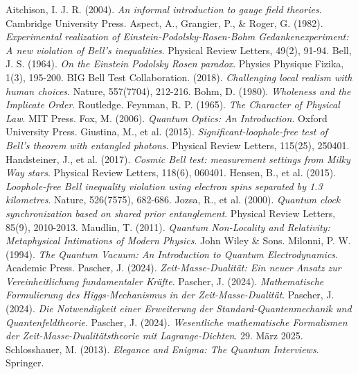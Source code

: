 \documentclass[12pt,a4paper]{article}
\begin{document}
	
	\begin{thebibliography}{99}
		 Aitchison, I. J. R. (2004). \textit{An informal introduction to gauge field theories}. Cambridge University Press.
		 Aspect, A., Grangier, P., \& Roger, G. (1982). \textit{Experimental realization of Einstein-Podolsky-Rosen-Bohm Gedankenexperiment: A new violation of Bell's inequalities}. Physical Review Letters, 49(2), 91-94.
		 Bell, J. S. (1964). \textit{On the Einstein Podolsky Rosen paradox}. Physics Physique Fizika, 1(3), 195-200.
		 BIG Bell Test Collaboration. (2018). \textit{Challenging local realism with human choices}. Nature, 557(7704), 212-216.
		 Bohm, D. (1980). \textit{Wholeness and the Implicate Order}. Routledge.
		 Feynman, R. P. (1965). \textit{The Character of Physical Law}. MIT Press.
		 Fox, M. (2006). \textit{Quantum Optics: An Introduction}. Oxford University Press.
		 Giustina, M., et al. (2015). \textit{Significant-loophole-free test of Bell's theorem with entangled photons}. Physical Review Letters, 115(25), 250401.
		 Handsteiner, J., et al. (2017). \textit{Cosmic Bell test: measurement settings from Milky Way stars}. Physical Review Letters, 118(6), 060401.
		 Hensen, B., et al. (2015). \textit{Loophole-free Bell inequality violation using electron spins separated by 1.3 kilometres}. Nature, 526(7575), 682-686.
		 Jozsa, R., et al. (2000). \textit{Quantum clock synchronization based on shared prior entanglement}. Physical Review Letters, 85(9), 2010-2013.
		 Maudlin, T. (2011). \textit{Quantum Non-Locality and Relativity: Metaphysical Intimations of Modern Physics}. John Wiley \& Sons.
		 Milonni, P. W. (1994). \textit{The Quantum Vacuum: An Introduction to Quantum Electrodynamics}. Academic Press.
		 Pascher, J. (2024). \textit{Zeit-Masse-Dualität: Ein neuer Ansatz zur Vereinheitlichung fundamentaler Kräfte}.
		 Pascher, J. (2024). \textit{Mathematische Formulierung des Higgs-Mechanismus in der Zeit-Masse-Dualität}.
		 Pascher, J. (2024). \textit{Die Notwendigkeit einer Erweiterung der Standard-Quantenmechanik und Quantenfeldtheorie}.
		 Pascher, J. (2024). \textit{Wesentliche mathematische Formalismen der Zeit-Masse-Dualitätstheorie mit Lagrange-Dichten}. 29. März 2025.
		 Schlosshauer, M. (2013). \textit{Elegance and Enigma: The Quantum Interviews}. Springer.

\end{thebibliography}
\end{document}
